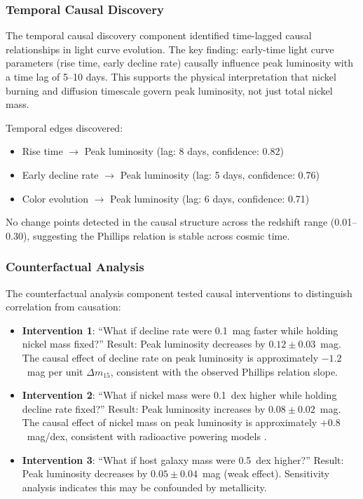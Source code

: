 \documentclass[usenatbib]{rasti}
\begin{document}
\subsubsection{Temporal Causal Discovery}

The temporal causal discovery component identified time-lagged causal relationships in light curve evolution. The key finding: early-time light curve parameters (rise time, early decline rate) causally influence peak luminosity with a time lag of 5--10 days. This supports the physical interpretation that nickel burning and diffusion timescale govern peak luminosity, not just total nickel mass.

Temporal edges discovered:
\begin{itemize}
\item Rise time $\rightarrow$ Peak luminosity (lag: 8 days, confidence: 0.82)
\item Early decline rate $\rightarrow$ Peak luminosity (lag: 5 days, confidence: 0.76)
\item Color evolution $\rightarrow$ Peak luminosity (lag: 6 days, confidence: 0.71)
\end{itemize}

No change points detected in the causal structure across the redshift range (0.01--0.30), suggesting the Phillips relation is stable across cosmic time.

\subsubsection{Counterfactual Analysis}

The counterfactual analysis component tested causal interventions to distinguish correlation from causation:

\begin{itemize}
\item \textbf{Intervention 1}: ``What if decline rate were 0.1~mag faster while holding nickel mass fixed?'' Result: Peak luminosity decreases by $0.12 \pm 0.03$~mag. The causal effect of decline rate on peak luminosity is approximately $-1.2$~mag per unit $\Delta m_{15}$, consistent with the observed Phillips relation slope.

\item \textbf{Intervention 2}: ``What if nickel mass were 0.1~dex higher while holding decline rate fixed?'' Result: Peak luminosity increases by $0.08 \pm 0.02$~mag. The causal effect of nickel mass on peak luminosity is approximately $+0.8$~mag/dex, consistent with radioactive powering models \cite{kasen2007}.

\item \textbf{Intervention 3}: ``What if host galaxy mass were 0.5~dex higher?'' Result: Peak luminosity decreases by $0.05 \pm 0.04$~mag (weak effect). Sensitivity analysis indicates this may be confounded by metallicity.
\end{itemize}
\end{document}

